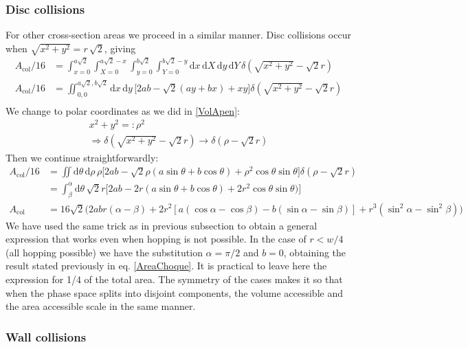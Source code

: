 \documentclass[superscriptaddress,pre,reprint,showpacs,twocolumn]{revtex4-1}
\newcommand{\rd}[1]{\mathrm{d}{#1} \,}
\begin{document}
  \subsubsection{Disc collisions}
  For other cross-section areas we proceed in a similar manner. 
  Disc collisions occur when $\sqrt{x^2 + y^2} = r \, \sqrt{2}$, giving
  \begin{align}
    A_\text{col}/16 & =\int_{x=0}^{a\sqrt{2}} \int_{X=0}^{a\sqrt{2}-x} \int_{y=0}^{b\sqrt{2}} \int_{Y=0}^{b\sqrt{2}-y}
    \rd x \rd X \rd y \rd Y
    \delta (\sqrt{x^2+y^2}-\sqrt{2}r)\\
    A_\text{col}/16 & =\iint _{0,0}^{a\sqrt{2},b\sqrt{2}}
    \rd x \rd y 
   \bigl[ 2ab-\sqrt{2}(ay+bx)+xy \bigr]
    \delta (\sqrt{x^2+y^2}-\sqrt{2}r)\\
    \end{align}
  We change to polar coordinates as we did in \ref{VolApen}:
  \begin{align}
    x^2+y^2 =: \rho^2 \\   \Rightarrow   \delta(\sqrt{x^2+y^2}-\sqrt{2}r) \rightarrow
    \delta(\rho-\sqrt{2}r)   
    \end{align}
  Then we continue straightforwardly:
    \begin{align}\label{app:colgeneral}
    A_\text{col}/16 & =\iint 
    \rd \theta \rd \rho \rho
    \bigl[2ab-\sqrt{2}\rho(a\sin\theta+b\cos\theta)+\rho^2\cos\theta\sin\theta
      \bigr]
    \delta(\rho-\sqrt{2}r) \\
    &=\int_\beta^\alpha \rd \theta \sqrt{2}r
    \bigl[
      2ab-2r(a\sin\theta+b\cos\theta)+2r^2\cos\theta\sin\theta)
      \bigr] \\
    A_\text{col} & = 16\sqrt{2} \bigl( 2abr(\alpha-\beta)
    + 2r^2 [a (\cos \alpha-\cos\beta) -b (\sin\alpha -\sin\beta)]
     + r^3(\sin^2 \alpha -\sin^2\beta) \bigr)
    \end{align}
    We have used the same trick as in previous subsection to obtain a general expression
    that works even when hopping is not possible. In the case of $r<w/4$ (all hopping possible)
    we have the substitution $\alpha=\pi/2$ and $b=0$, obtaining the result stated previously
    in eq. \ref{AreaChoque}. It is practical to leave here the expression for 1/4 of the
    total area. The symmetry of the cases makes it so that when the phase space splits
    into disjoint components, the volume accessible and the area accessible scale in
    the same manner.
    
    \subsubsection{Wall collisions}
\end{document}
